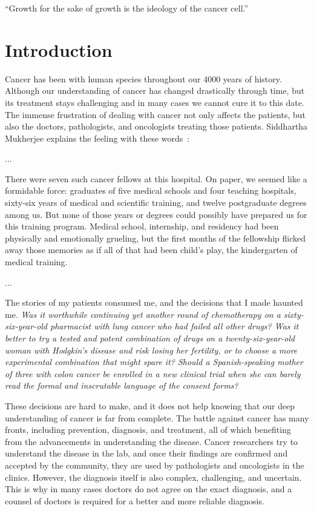 
\begin{savequote}[.5\linewidth]
  ``Growth for the sake of growth is the ideology of the cancer cell.''
\end{savequote}
\chapter{Introduction}
\label{ch:intro}
Cancer has been with human species throughout our 4000 years of history. Although our understanding of cancer has changed drastically through time, but its treatment stays challenging and in many cases we cannot cure it to this date. The immense frustration of dealing with cancer not only affects the patients, but also the doctors, pathologists, and oncologists treating those patients. Siddhartha Mukherjee explains the feeling with these words~\cite[prologue]{the-emperor-of-all-maladies}:

\begin{displayquote}
  ...
  
  There were seven such cancer fellows at this hospital. On paper, we seemed like a formidable force: graduates of five medical schools and four teaching hospitals, sixty-six years of medical and scientific training, and twelve postgraduate degrees among us. But none of those years or degrees could possibly have prepared us for this training program. Medical school, internship, and residency had been physically and emotionally grueling, but the first months of the fellowship flicked away those memories as if all of that had been child's play, the kindergarten of medical training.

  ...

  The stories of my patients consumed me, and the decisions that I made haunted me. \emph{Was it worthwhile continuing yet another round of chemotherapy on a sixty-six-year-old pharmacist with lung cancer who had failed all other drugs? Was it better to try a tested and potent combination of drugs on a twenty-six-year-old woman with Hodgkin's disease and risk losing her fertility, or to choose a more experimental combination that might spare it? Should a Spanish-speaking mother of three with colon cancer be enrolled in a new clinical trial when she can barely read the formal and inscrutable language of the consent forms?}
\end{displayquote}

These decisions are hard to make, and it does not help knowing that our deep understanding of cancer is far from complete. The battle against cancer has many fronts, including prevention, diagnosis, and treatment, all of which benefiting from the advancements in understanding the disease. Cancer researchers try to understand the disease in the lab, and once their findings are confirmed and accepted by the community, they are used by pathologists and oncologists in the clinics. However, the diagnosis itself is also complex, challenging, and uncertain. This is why in many cases doctors do not agree on the exact diagnosis, and a counsel of doctors is required for a better and more reliable diagnosis.

